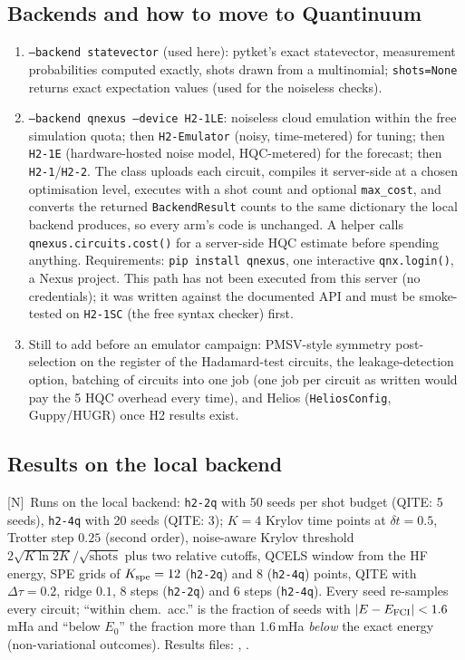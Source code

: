 \documentclass[11pt,a4paper]{article}
\newcommand{\lN}{\textcolor{keyblue}{[N]}}   %
\begin{document}
\subsection{Backends and how to move to Quantinuum}
\begin{enumerate}
\item \texttt{--backend statevector} (used here): pytket's exact statevector, measurement probabilities computed exactly, shots drawn from a multinomial; \texttt{shots=None} returns exact expectation values (used for the noiseless checks).
\item \texttt{--backend qnexus --device H2-1LE}: noiseless cloud emulation within the free simulation quota; then \texttt{H2-Emulator} (noisy, time-metered) for tuning; then \texttt{H2-1E} (hardware-hosted noise model, HQC-metered) for the forecast; then \texttt{H2-1}/\texttt{H2-2}. The class uploads each circuit, compiles it server-side at a chosen optimisation level, executes with a shot count and optional \texttt{max\_cost}, and converts the returned \texttt{BackendResult} counts to the same dictionary the local backend produces, so every arm's code is unchanged. A helper calls \texttt{qnexus.circuits.cost()} for a server-side HQC estimate before spending anything. Requirements: \texttt{pip install qnexus}, one interactive \texttt{qnx.login()}, a Nexus project. \alert{This path has not been executed from this server} (no credentials); it was written against the documented API and must be smoke-tested on \texttt{H2-1SC} (the free syntax checker) first.
\item Still to add before an emulator campaign: PMSV-style symmetry post-selection on the register of the Hadamard-test circuits, the leakage-detection option, batching of circuits into one job (one job per circuit as written would pay the 5 HQC overhead every time), and Helios (\texttt{HeliosConfig}, Guppy/HUGR) once H2 results exist.
\end{enumerate}

\subsection{Results on the local backend}\label{sec:coderesults}
\lN\ Runs on the local backend: \texttt{h2-2q} with 50 seeds per shot budget (QITE: 5 seeds), \texttt{h2-4q} with 20 seeds (QITE: 3); $K=4$ Krylov time points at $\delta t=0.5$, Trotter step $0.25$ (second order), noise-aware Krylov threshold $2\sqrt{K\ln 2K}/\sqrt{\text{shots}}$ plus two relative cutoffs, QCELS window from the HF energy, SPE grids of $K_{\rm spe}=12$ (\texttt{h2-2q}) and $8$ (\texttt{h2-4q}) points, QITE with $\Delta\tau=0.2$, ridge $0.1$, 8 steps (\texttt{h2-2q}) and 6 steps (\texttt{h2-4q}). Every seed re-samples every circuit; ``within chem.\ acc.'' is the fraction of seeds with $|E-E_{\rm FCI}|<1.6$\,mHa and ``below $E_0$'' the fraction more than 1.6\,mHa \emph{below} the exact energy (non-variational outcomes). Results files: , .
\end{document}
